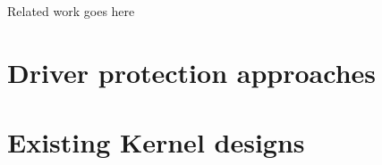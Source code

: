 Related work goes here 
 
\section {Driver protection approaches }
\section{Existing Kernel designs}

% 
